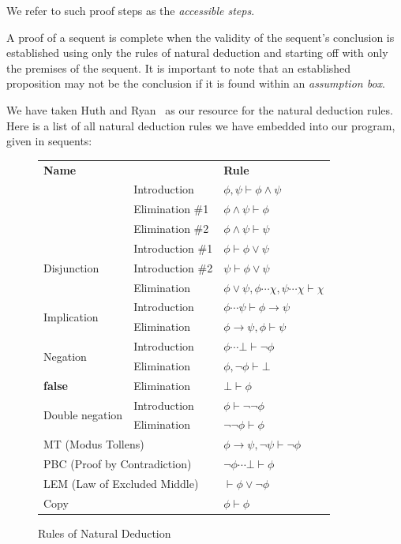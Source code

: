 \documentclass[12pt]{article}
\newcommand{\imp}{\ensuremath{\rightarrow}}
\newcommand{\false}{\textbf{false}}
\begin{document}
We refer to such proof steps as the \textit{accessible steps}.

A proof of a sequent is complete when the validity of the sequent's conclusion
is established using only the rules of natural deduction and
starting off with only the premises of the sequent. It is important to
note that an established proposition may not be the conclusion if it is
found within an \textit{assumption box}.

We have taken Huth and Ryan~\cite{huth2004logic} as our resource for the
natural deduction rules. Here is a list of all natural deduction rules we
have embedded into our program, given in sequents:

\begin{figure}[H]
	\centering
	\renewcommand{\arraystretch}{1}
	\newcommand{\nl}{\\[3pt]}
	\newcommand{\nll}{\\[3pt]\hline}
	\begin{tabular}{l l|l}
		\multicolumn{2}{l|}{\textbf{Name}} & \textbf{Rule}\\\hhline{==|=}
		\multirow{3}{*}{Conjunction}
		& Introduction    & $\phi, \psi \vdash \phi \land \psi$\nl
		& Elimination \#1 & $\phi \land \psi \vdash \phi$\nl
		& Elimination \#2 & $\phi \land \psi \vdash \psi$\nll
		\multirow{3}{*}{Disjunction}
		& Introduction \#1 & $\phi \vdash \phi \lor \psi$\nl
		& Introduction \#2 & $\psi \vdash \phi \lor \psi$\nl
		& Elimination      & $\phi \lor \psi, \boxed{\phi \dotsb \chi},
			\boxed{\psi \dotsb \chi} \vdash \chi$\nll
		\multirow{2}{*}{Implication}
		& Introduction & $\boxed{\phi \dotsb \psi} \vdash \phi \imp \psi$\nl
		& Elimination  & $\phi \imp \psi, \phi \vdash \psi$\nll
		\multirow{2}{*}{Negation}
		& Introduction & $\boxed{\phi \dotsb \bot} \vdash \neg\phi$\nl
		& Elimination  & $\phi, \neg\phi \vdash \bot$\nll
		\multirow{1}{*}{\false{}}
		& Elimination  & $\bot \vdash \phi$\nll
		\multirow{2}{*}{Double negation}
		& Introduction & $\phi \vdash \neg\neg\phi$\nl
		& Elimination  & $\neg\neg\phi \vdash \phi$\nll
		\multicolumn{2}{l|}{MT (Modus Tollens)}
		& $\phi \imp \psi, \neg\psi \vdash \neg\phi$\nll
		\multicolumn{2}{l|}{PBC (Proof by Contradiction)}
		& $\boxed{\neg\phi \dotsb \bot} \vdash \phi$\nll
		\multicolumn{2}{l|}{LEM (Law of Excluded Middle)}
		& $\vdash \phi \lor \neg\phi$\nll
		\multicolumn{2}{l|}{Copy}
		& $\phi \vdash \phi$
	\end{tabular}
	\caption{Rules of Natural Deduction}
	\label{fig:nd}
\end{figure}
\end{document}
